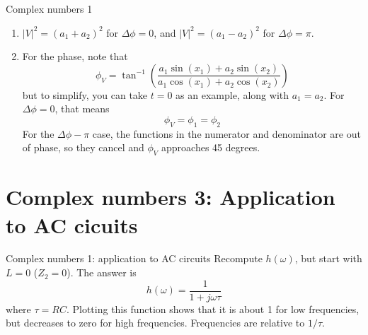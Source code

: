 \documentclass{beamer}
\begin{document}
\begin{frame}{Complex numbers 1}
\begin{enumerate}
\item $|V|^2 = (a_1 + a_2)^2$ for $\Delta \phi = 0$, and $|V|^2 = (a_1 - a_2)^2$ for $\Delta \phi = \pi$.
\item For the phase, note that 
\begin{equation}
\phi_V = \tan^{-1}\left( \frac{a_1\sin(x_1) + a_2\sin(x_2)}{a_1\cos(x_1) + a_2\cos(x_2)} \right)
\end{equation}
but to simplify, you can take $t = 0$ as an example, along with $a_1 = a_2$.  For $\Delta \phi = 0$, that means
\begin{equation}
\phi_V = \phi_1 = \phi_2
\end{equation}
For the $\Delta \phi - \pi$ case, the functions in the numerator and denominator are out of phase, so they cancel and $\phi_V$ approaches 45 degrees.
\end{enumerate}
\end{frame}

\section{Complex numbers 3: Application to AC cicuits}

\begin{frame}{Complex numbers 1: application to AC circuits}
Recompute $h(\omega)$, but start with $L = 0$ ($Z_2 = 0$).  The answer is
\begin{equation}
h(\omega) = \frac{1}{1+j\omega\tau}
\end{equation}
where $\tau = RC$.  Plotting this function shows that it is about 1 for low frequencies, but decreases to zero for high frequencies.  Frequencies are relative to $1/\tau$.
\end{frame}
\end{document}
